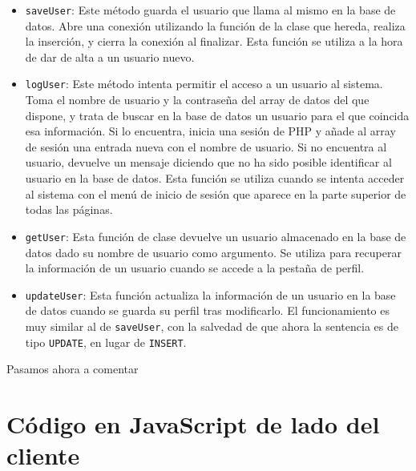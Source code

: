 \documentclass[11pt]{article}
\theoremstyle{plain}
\theoremstyle{definition}
\begin{document}
\begin{itemize}
\item \texttt{saveUser}: Este método guarda el usuario que llama al
  mismo en la base de datos. Abre una conexión utilizando la función
  de la clase que hereda, realiza la inserción, y cierra la conexión
  al finalizar. Esta función se utiliza a la hora de dar de alta
  a un usuario nuevo.
\item \texttt{logUser}: Este método intenta permitir el acceso a un
  usuario al sistema. Toma el nombre de usuario y la contraseña del
  array de datos del que dispone, y trata de buscar en la base de
  datos un usuario para el que coincida esa información. Si lo
  encuentra, inicia una sesión de PHP y añade al array de sesión
  una entrada nueva con el nombre de usuario. Si no encuentra
  al usuario, devuelve un mensaje diciendo que no ha sido posible
  identificar al usuario en la base de datos. Esta función se
  utiliza cuando se intenta acceder al sistema con el menú de
  inicio de sesión que aparece en la parte superior de todas
  las páginas.
\item \texttt{getUser}: Esta función de clase devuelve un usuario
  almacenado en la base de datos dado su nombre de usuario como
  argumento. Se utiliza para recuperar la información de un usuario
  cuando se accede a la pestaña de perfil.
\item \texttt{updateUser}: Esta función actualiza la información de
  un usuario en la base de datos cuando se guarda su perfil tras
  modificarlo. El funcionamiento es muy similar al de \texttt{saveUser},
  con la salvedad de que ahora la sentencia es de tipo \texttt{UPDATE},
  en lugar de \texttt{INSERT}.
\end{itemize}

Pasamos ahora a comentar
\section{Código en JavaScript de lado del cliente}
\end{document}
